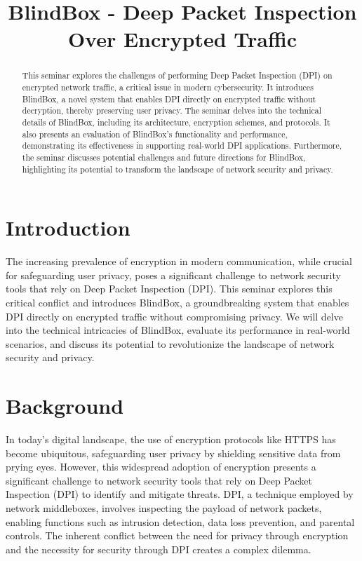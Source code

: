 \documentclass[conference]{IEEEtran}
\begin{document}
\title{BlindBox - Deep Packet Inspection Over Encrypted Traffic
}

\author{
}

\maketitle

\begin{abstract}
This seminar explores the challenges of performing Deep Packet Inspection (DPI) on encrypted network traffic, a critical issue in modern cybersecurity. It introduces BlindBox, a novel system that enables DPI directly on encrypted traffic without decryption, thereby preserving user privacy. The seminar delves into the technical details of BlindBox, including its architecture, encryption schemes, and protocols. It also presents an evaluation of BlindBox's functionality and performance, demonstrating its effectiveness in supporting real-world DPI applications. Furthermore, the seminar discusses potential challenges and future directions for BlindBox, highlighting its potential to transform the landscape of network security and privacy.
\end{abstract}

\section{Introduction}

The increasing prevalence of encryption in modern communication, while crucial for safeguarding user privacy, poses a significant challenge to network security tools that rely on Deep Packet Inspection (DPI). This seminar explores this critical conflict and introduces BlindBox, a groundbreaking system that enables DPI directly on encrypted traffic without compromising privacy. We will delve into the technical intricacies of BlindBox, evaluate its performance in real-world scenarios, and discuss its potential to revolutionize the landscape of network security and privacy.

\section{Background}

In today's digital landscape, the use of encryption protocols like HTTPS has become ubiquitous, safeguarding user privacy by shielding sensitive data from prying eyes. However, this widespread adoption of encryption presents a significant challenge to network security tools that rely on Deep Packet Inspection (DPI) to identify and mitigate threats. DPI, a technique employed by network middleboxes, involves inspecting the payload of network packets, enabling functions such as intrusion detection, data loss prevention, and parental controls. The inherent conflict between the need for privacy through encryption and the necessity for security through DPI creates a complex dilemma.
\end{document}
